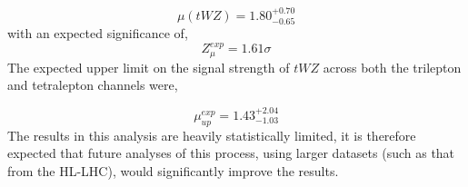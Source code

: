 \begin{equation}
  \mu (tWZ) =   1.80^{+0.70}_{-0.65}
\end{equation}
with an expected significance of,
\begin{equation}
 Z_{\mu}^{exp} = 1.61\sigma
\end{equation}
The expected upper limit on the signal strength of $tWZ$ across both the trilepton and tetralepton channels were,

\begin{equation}
  \mu_{up}^{exp} =   1.43^{+2.04}_{-1.03}
\end{equation}
The results in this analysis are heavily statistically limited, it is therefore expected that future analyses of this process, using larger datasets (such as that from the HL-LHC), would significantly improve the results.










